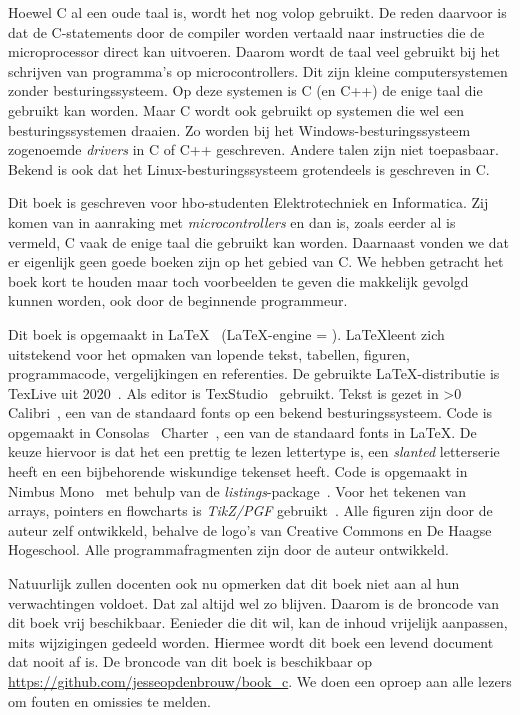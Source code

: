 Hoewel C al een oude taal is, wordt het nog volop gebruikt. De reden daarvoor is
dat de C-statements door de compiler worden vertaald naar instructies die de
microprocessor direct kan uitvoeren. Daarom wordt de taal veel gebruikt bij
het schrijven van programma's op microcontrollers. Dit zijn kleine computersystemen
zonder besturingssysteem. Op deze systemen is C (en C++) de enige taal die
gebruikt kan worden. Maar C wordt ook gebruikt op systemen die wel een
besturingssystemen draaien. Zo worden bij het Windows-besturingssysteem
zogenoemde \textsl{drivers} in C of C++ geschreven. Andere talen zijn niet
toepasbaar. Bekend is ook dat het Linux-besturingssysteem grotendeels is
geschreven in C.

Dit boek is geschreven voor hbo-studenten Elektrotechniek en Informatica. Zij
komen van in aanraking met \textsl{microcontrollers} en dan is, zoals eerder al
is vermeld, C vaak de enige taal die gebruikt kan worden. Daarnaast vonden we dat
er eigenlijk geen goede boeken zijn op het gebied van C. We hebben getracht het
boek kort te houden maar toch voorbeelden te geven die makkelijk gevolgd kunnen
worden, ook door de beginnende programmeur.

Dit boek is opgemaakt in \LaTeX~\cite{latexwebsite} (\LaTeX-engine = \booktexbanner).
\LaTeX\@ leent zich uitstekend
voor het opmaken van lopende tekst, tabellen, figuren, programmacode, vergelijkingen
en referenties. De gebruikte \LaTeX-distributie is TexLive uit 2020~\cite{texlivewebsite}.
Als editor is TexStudio~\cite{texstudiowebsite} gebruikt. Tekst is gezet in
\fi{}\fi>0
Calibri~\cite{calibrifont}, een van de standaard fonts op een bekend besturingssysteem.
Code is opgemaakt in Consolas~\cite{consolasfont}
\else
Charter~\cite{charterfont}, een van de standaard fonts in \LaTeX.
De keuze hiervoor is dat het een prettig te lezen lettertype is, een
\textsl{slanted} letterserie heeft en een bijbehorende wiskundige tekenset heeft.
Code is opgemaakt in Nimbus Mono~\cite{nimbusfont}
\fi
met behulp van de \textsl{listings}-package~\cite{listingsctan}.
Voor het
tekenen van arrays, pointers en flowcharts is \textsl{TikZ/PGF} gebruikt~\cite{tikzctan}.
Alle figuren zijn door de auteur zelf ontwikkeld, behalve de logo's van Creative
Commons en De Haagse Hogeschool. Alle programmafragmenten zijn door de auteur ontwikkeld.

Natuurlijk zullen docenten ook nu opmerken dat dit boek niet aan al hun
verwachtingen voldoet. Dat zal altijd wel zo blijven. Daarom is de broncode
van dit boek vrij beschikbaar. Eenieder die dit wil, kan de inhoud
vrijelijk aanpassen, mits wijzigingen gedeeld
worden. Hiermee wordt dit boek een levend document dat nooit af is.
De broncode
van dit boek is beschikbaar op \url{https://github.com/jesseopdenbrouw/book_c}. We doen
een oproep aan alle lezers om fouten en omissies te melden.


